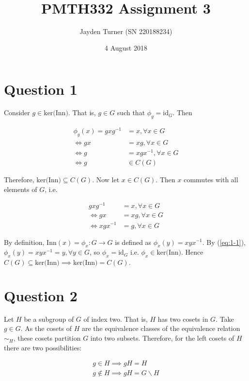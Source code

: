 \documentclass{article}
\title{PMTH332 Assignment 3}
\date{4 August 2018}
\author{Jayden Turner (SN 220188234)}
\begin{document}
\maketitle
{}

\section*{Question 1}

Consider $g \in \text{ker(Inn)}$. That is, $g \in G$ such that $\phi_g = \text{id}_G$. Then

\begin{align*}
    \phi_g(x) = gxg^{-1} &= x, \forall x \in G\\
    \iff gx &= xg, \forall x \in G\\
    \iff g &= xgx^{-1}, \forall x \in G\\
    \iff g &\in C(G)
\end{align*}

Therefore, $\text{ker(Inn)} \subseteq C(G)$. Now let $x \in C(G)$. Then $x$ commutes with all elements of $G$, i.e.

\begin{align}
    gxg^{-1} &= x, \forall x \in G \nonumber\\
    \iff gx &= xg, \forall x \in G \nonumber\\
    \iff xgx^{-1} &= g, \forall x \in G \label{eq:1-1}
\end{align}

By definition, $\text{Inn}(x) = \phi_x:G \to G$ is defined as $\phi_x(y) = xyx^{-1}$. By (\ref{eq:1-1}),
$\phi_x(y) = xyx^{-1} = y, \forall y \in G$, so $\phi_x = \text{id}_G$ i.e. $\phi_x \in \text{ker(Inn)}$.
Hence $C(G) \subseteq \text{ker(Inn)} \implies \text{ker(Inn)} = C(G)$.

\section*{Question 2}

Let $H$ be a subgroup of $G$ of index two. That is, $H$ has two cosets in $G$. Take $g \in G$. As the cosets of $H$ are the equivalence
classes of the equivalence relation $\sim_H$, these cosets partition $G$ into two subsets. Therefore, for the left cosets of $H$ there are two possibilities:

\begin{align*}
    g \in H \implies gH = H\\
    g \notin H \implies gH = G\backslash H
\end{align*}
\end{document}
